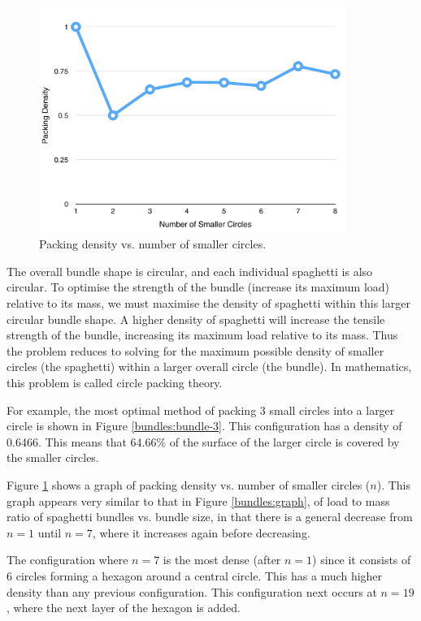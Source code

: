 \documentclass[a4paper,11pt]{article}
\begin{document}
\begin{figure}
\begin{center}
\includegraphics[width=10cm]{figures/density.png}
\end{center}
\caption{Packing density vs. number of smaller circles.}
\label{bundles:density}
\end{figure}

The overall bundle shape is circular, and each individual spaghetti is also
circular.
To optimise the strength of the bundle (increase its maximum load) relative to
its mass, we must maximise the density of spaghetti within this larger circular
bundle shape.
A higher density of spaghetti will increase the tensile strength of the bundle,
increasing its maximum load relative to its mass.
Thus the problem reduces to solving for the maximum possible density of
smaller circles (the spaghetti) within a larger overall circle (the bundle).
In mathematics, this problem is called circle packing theory.

For example, the most optimal method of packing 3 small circles into a larger
circle is shown in Figure \ref{bundles:bundle-3}.
This configuration has a density of 0.6466.
This means that 64.66\% of the surface of the larger circle is covered by the
smaller circles.

Figure \ref{bundles:density} shows a graph of packing density vs. number of
smaller circles ($n$).
This graph appears very similar to that in Figure \ref{bundles:graph}, of load
to mass ratio of spaghetti bundles vs. bundle size, in that there is a general
decrease from $n = 1$ until $n = 7$, where it increases again before decreasing.

The configuration where $n = 7$ is the most dense (after $n = 1$) since it
consists of 6 circles forming a hexagon around a central circle.
This has a much higher density than any previous configuration.
This configuration next occurs at $n = 19$, where the next layer of the hexagon
is added.
\end{document}
